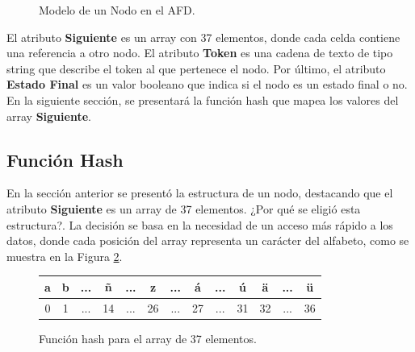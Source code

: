\documentclass[twocolumn, fontsize=10pt]{article}
\begin{document}
\begin{figure}[H]
	\caption{Modelo de un Nodo en el AFD.}
	\label{fig:estructura_nodo}
\end{figure}

El atributo \textbf{Siguiente} es un array con 37 elementos, donde cada celda contiene una referencia a otro nodo. El atributo \textbf{Token} es una cadena de texto de tipo string que describe el token al que pertenece el nodo. Por último, el atributo \textbf{Estado Final} es un valor booleano que indica si el nodo es un estado final o no. En la siguiente sección, se presentará la función hash que mapea los valores del array \textbf{Siguiente}.

\subsection{Función Hash}
En la sección anterior se presentó la estructura de un nodo, destacando que el atributo \textbf{Siguiente} es un array de 37 elementos. ¿Por qué se eligió esta estructura?. La decisión se basa en la necesidad de un acceso más rápido a los datos, donde cada posición del array representa un carácter del alfabeto, como se muestra en la Figura \ref{fig:funcion_hash}.

\begin{figure}[H]
	\begin{tabular}{|c|c|c|c|c|c|c|c|c|c|c|c|c|}
  		\hline
		a & b & ... & ñ & ... & z & ... & á & ... & ú & ä & ... & ü \\
  		\hline
  		0 & 1 & ... & 14 & ... & 26 & ... & 27 & ... & 	31 & 32 & ... & 36 \\
  		\hline
	\end{tabular}
	\caption{Función hash para el array de 37 elementos.}
	\label{fig:funcion_hash}
\end{figure}
\end{document}
